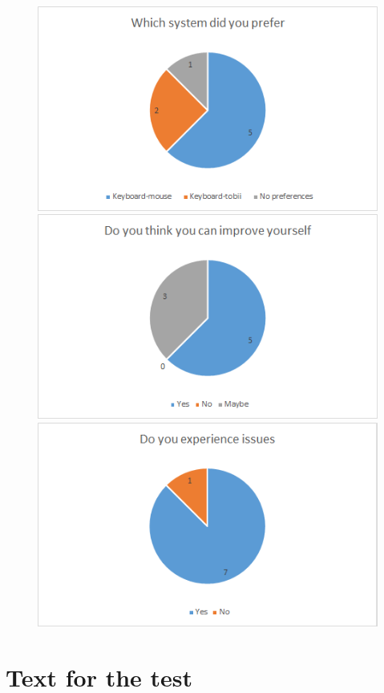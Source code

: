 \documentclass[12pt, a4paper]{article}
\begin{document}
\begin{figure}[H]
\includegraphics[scale =.59]{Preference}
\includegraphics[scale =.59]{Improvement}
\includegraphics[scale =.59]{Issues}
\end{figure}
\newpage
\section{Text for the test}
\label{Test}

 
\end{document}
